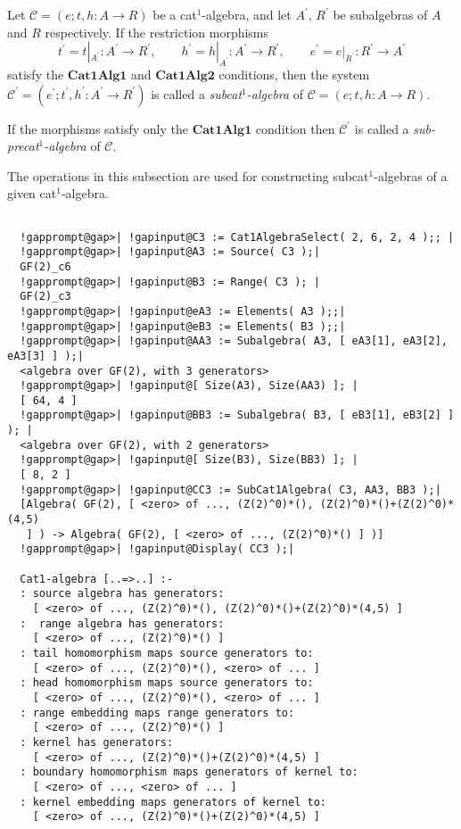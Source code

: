 \documentclass[a4paper,11pt]{report}
\begin{document}
{{{ Let $\mathcal{C} = (e;t,h:A\rightarrow R)$ be a cat$^{1}$-algebra, and let $A^{\prime}$, $R^{\prime}$ be subalgebras of $A$ and $R$ respectively. If the restriction morphisms 
\[ t^{\prime} = t|_{A^{\prime}} : A^{\prime}\rightarrow R^{\prime}, \qquad
h^{\prime} = h|_{A^{\prime}} : A^{\prime}\rightarrow R^{\prime}, \qquad
e^{\prime} = e|_{R^{\prime}} : R^{\prime}\rightarrow A^{\prime} \]
 satisfy the $\mathbf{Cat1Alg1}$ and $\mathbf{Cat1Alg2}$ conditions, then the system $\mathcal{C}^{\prime } = (e^{\prime};t^{\prime},h^{\prime} : A^{\prime}
\rightarrow R^{\prime})$ is called a \emph{subcat$^{1}$-algebra} of $\mathcal{C} = (e;t,h:A\rightarrow R)$. 

 If the morphisms satisfy only the $\mathbf{Cat1Alg1}$ condition then $\mathcal{C}^{\prime }$ is called a \emph{sub-precat$^{1}$-algebra} of $\mathcal{C}$. 

 The operations in this subsection are used for constructing subcat$^{1}$-algebras of a given cat$^{1}$-algebra. }

 
\begin{Verbatim}[commandchars=!@|,fontsize=\small,frame=single,label=Example]
  
  !gapprompt@gap>| !gapinput@C3 := Cat1AlgebraSelect( 2, 6, 2, 4 );; |
  !gapprompt@gap>| !gapinput@A3 := Source( C3 );|
  GF(2)_c6
  !gapprompt@gap>| !gapinput@B3 := Range( C3 ); |
  GF(2)_c3
  !gapprompt@gap>| !gapinput@eA3 := Elements( A3 );;|
  !gapprompt@gap>| !gapinput@eB3 := Elements( B3 );;|
  !gapprompt@gap>| !gapinput@AA3 := Subalgebra( A3, [ eA3[1], eA3[2], eA3[3] ] );|
  <algebra over GF(2), with 3 generators>
  !gapprompt@gap>| !gapinput@[ Size(A3), Size(AA3) ]; |
  [ 64, 4 ]
  !gapprompt@gap>| !gapinput@BB3 := Subalgebra( B3, [ eB3[1], eB3[2] ] ); |
  <algebra over GF(2), with 2 generators>
  !gapprompt@gap>| !gapinput@[ Size(B3), Size(BB3) ]; |
  [ 8, 2 ]
  !gapprompt@gap>| !gapinput@CC3 := SubCat1Algebra( C3, AA3, BB3 );|
  [Algebra( GF(2), [ <zero> of ..., (Z(2)^0)*(), (Z(2)^0)*()+(Z(2)^0)*(4,5) 
   ] ) -> Algebra( GF(2), [ <zero> of ..., (Z(2)^0)*() ] )]
  !gapprompt@gap>| !gapinput@Display( CC3 );|
  
  Cat1-algebra [..=>..] :-
  : source algebra has generators:
    [ <zero> of ..., (Z(2)^0)*(), (Z(2)^0)*()+(Z(2)^0)*(4,5) ]
  :  range algebra has generators:
    [ <zero> of ..., (Z(2)^0)*() ]
  : tail homomorphism maps source generators to:
    [ <zero> of ..., (Z(2)^0)*(), <zero> of ... ]
  : head homomorphism maps source generators to:
    [ <zero> of ..., (Z(2)^0)*(), <zero> of ... ]
  : range embedding maps range generators to:
    [ <zero> of ..., (Z(2)^0)*() ]
  : kernel has generators:
    [ <zero> of ..., (Z(2)^0)*()+(Z(2)^0)*(4,5) ]
  : boundary homomorphism maps generators of kernel to:
    [ <zero> of ..., <zero> of ... ]
  : kernel embedding maps generators of kernel to:
    [ <zero> of ..., (Z(2)^0)*()+(Z(2)^0)*(4,5) ]
  

\end{Verbatim}}}
\end{document}
